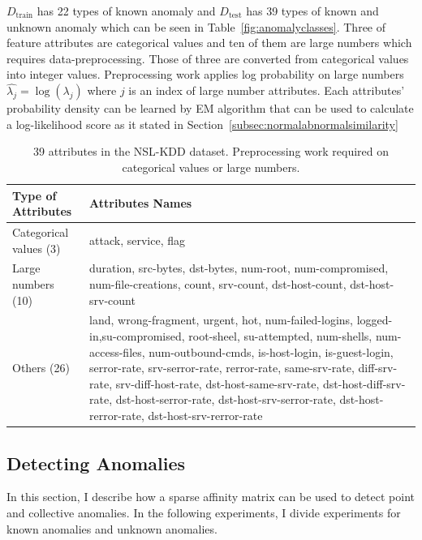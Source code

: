 $D_{\text{train}}$ has 22 types of known anomaly and $D_{\text{test}}$ has 39 types of known and unknown anomaly which can be seen in Table~\ref{fig:anomalyclasses}. 
Three of feature attributes are categorical values and ten of them are large numbers which requires data-preprocessing. 
Those of three are converted from categorical values into integer values. 
Preprocessing work applies log probability on large numbers $\hat{\lambda_{j}} = \log (\lambda_{j})$ where $j$ is an index of large number attributes. 
Each attributes' probability density can be learned by EM algorithm that can be used to calculate a log-likelihood score as it stated in Section~\ref{subsec:normalabnormalsimilarity}
\begin{table}[h]
\begin{center}
\begin{tabular}{| l | p{10cm} |}
\hline
Type of Attributes & Attributes Names \\
\hline
Categorical values (3) & attack, service, flag \\
\hline
Large numbers (10) & duration, src-bytes, dst-bytes, num-root, num-compromised, num-file-creations, count, srv-count, dst-host-count, dst-host-srv-count \\
\hline
Others (26) & land, wrong-fragment, urgent, hot, num-failed-logins, logged-in,su-compromised, root-sheel, su-attempted, num-shells, num-access-files, num-outbound-cmds, is-host-login, is-guest-login, serror-rate, srv-serror-rate, rerror-rate, same-srv-rate, diff-srv-rate, srv-diff-host-rate, dst-host-same-srv-rate, dst-host-diff-srv-rate, dst-host-serror-rate, dst-host-srv-serror-rate, dst-host-rerror-rate, dst-host-srv-rerror-rate \\
\hline
\end{tabular}
\end{center}
\caption{39 attributes in the NSL-KDD dataset. Preprocessing work required on categorical values or large numbers.}
\label{fig:preprocessing}
\end{table}

\subsection{Detecting Anomalies}
\label{subsec:detectinganomalies}
In this section, I describe how a sparse affinity matrix can be used to detect point and collective anomalies. 
In the following experiments, I divide experiments for known anomalies and unknown anomalies. 

